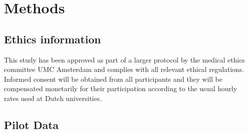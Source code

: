 \documentclass{article}
\begin{document}
\section{Methods}

\subsection{Ethics information}
\begin{comment}
    • If your protocol describes research with human participants, the Methods section must start with a statement confirming that the research complies with all relevant ethical regulations; naming the board and institution that approved the study protocol; and confirming that informed consent will be obtained from all human participants. Information on participant compensation must also be included. 
    • If your manuscript reports the results of research with non-human animals, the Methods section starts with a statement confirming that the research complies with all relevant ethical regulations; naming the board and institution that approved the study protocol; and confirming that the ARRIVE guidelines were used to report the research.
    • If your manuscript reports the results of a clinical trial, the Ethics information section also includes the trial registration number from ClinicalTrials.gov or an equivalent approved trials registry.
\end{comment}
This study has been approved as part of a larger protocol by the medical ethics committee UMC Amsterdam and complies with all relevant ethical regulations. Informed consent will be obtained from all participants and they will be compensated monetarily for their participation according to the usual hourly rates used at Dutch universities.

\subsection{Pilot Data}

\begin{comment}
    • You may include pilot data, for example to demonstrate the feasibility of your approach. Your pilot studies and results should be described briefly in the main manuscript and reported in full in Supplementary Information. 
    • Pilot data and custom analyses code should be made available and referred to in the Data Availability statement and Code availability statement. You may also include simulated data, for example to support your power analysis. This should also be made available.
    • If you report analyses of pilot data using NHST (either in the main text or in Supplementary Information), you must report statistics in full: statistic(degrees of freedom) = value, p = value, effect size statistic = value, %
\end{comment}
\end{document}
